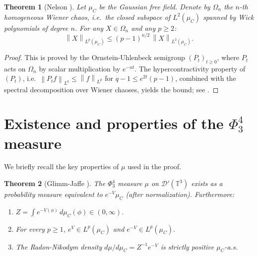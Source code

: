 \documentclass[12pt]{article}
\newtheorem{theorem}{Theorem}[section]
\newcommand{\T}{\mathbb{T}}
\newcommand{\Dc}{\mathcal{D}}
\newcommand{\norm}[1]{\left\|#1\right\|}
\begin{document}
\begin{theorem}[Nelson \cite{NelsonHyper1973}]\label{thm:Nelson}
Let $\mu_C$ be the Gaussian free field.  Denote by $\Omega_n$ the $n$-th homogeneous Wiener
chaos, i.e.\ the closed subspace of $L^2(\mu_C)$ spanned by Wick polynomials of degree $n$.
For any $X\in\Omega_n$ and any $p\ge 2$:
\[
  \norm{X}_{L^p(\mu_C)} \le (p-1)^{n/2}\,\norm{X}_{L^2(\mu_C)}.
\]
\end{theorem}

\begin{proof}
This is proved by the Ornstein-Uhlenbeck semigroup $(P_t)_{t\ge 0}$, where $P_t$ acts on
$\Omega_n$ by scalar multiplication by $e^{-nt}$.  The hypercontractivity property of
$(P_t)$, i.e.\ $\norm{P_t f}_{L^q}\le\norm{f}_{L^p}$ for $q-1\le e^{2t}(p-1)$, combined
with the spectral decomposition over Wiener chaoses, yields the bound; see
\cite[Theorem~5.8]{Janson1997}.
\end{proof}

\section{Existence and properties of the $\Phi^4_3$ measure}

We briefly recall the key properties of $\mu$ used in the proof.

\begin{theorem}[Glimm-Jaffe \cite{GlimmJaffe1987}]\label{thm:GJ}
The $\Phi^4_3$ measure $\mu$ on $\Dc'(\T^3)$ exists as a probability measure equivalent to
$e^{-V}\mu_C$ (after normalization).  Furthermore:
\begin{enumerate}
  \item $Z = \int e^{-V(\phi)}\,d\mu_C(\phi)\in(0,\infty)$.
  \item For every $p\ge 1$, $e^{V}\in L^p(\mu_C)$ and $e^{-V}\in L^p(\mu_C)$.
  \item The Radon-Nikodym density $d\mu/d\mu_C = Z^{-1}e^{-V}$ is strictly positive
        $\mu_C$-a.s.
\end{enumerate}
\end{theorem}
\end{document}
